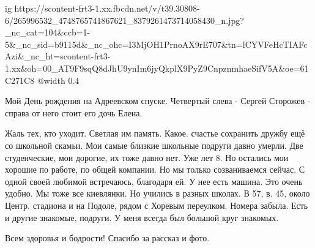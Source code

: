  
 
 
 
 

\ifcmt
  ig https://scontent-frt3-1.xx.fbcdn.net/v/t39.30808-6/265996532_4748765741867621_8379261473714058430_n.jpg?_nc_cat=104&ccb=1-5&_nc_sid=b9115d&_nc_ohc=I3MjOH1PrnoAX9rE707&tn=lCYVFeHcTIAFcAzi&_nc_ht=scontent-frt3-1.xx&oh=00_AT9F9sqQ8dJhU9ynIm6jyQkplX9PyZ9CnpznmhaeSifV5A&oe=61C271C8
  @width 0.4
\fi


Мой День рождения на Адреевском спуске. Четвертый слева - Сергей Сторожев -
справа от него стоит его дочь Елена.


Жаль тех, кто уходит. Светлая им память. Какое. счастье сохранить дружбу ещё со
школьной скамьи. Мои самые близкие школьные подруги давно умерли. Две
студенческие, мои дорогие, их тоже давно нет. Уже лет 8. Но остались мои хорошие
по работе, по общей компании. Но мы только созваниваемся сейчас. С одной своей
любимой встречаюсь, благодаря ей. У нее есть машина. Это очень удобно. Мы тоже все
киевлянки. Но учились в разных школах. В 57, в. 45, около Центр. стадиона и на
Подоле, рядом с Хоревым переулком. Номера забыла. Есть и другие знакомые,
подруги. У меня всегда был большой круг знакомых.


Всем здоровья и бодрости! Спасибо за рассказ и фото.
